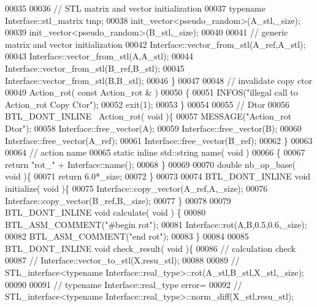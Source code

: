 \begin{DoxyCode}
00035 
00036     \textcolor{comment}{// STL matrix and vector initialization}
00037     \textcolor{keyword}{typename} Interface::stl\_matrix tmp;
00038     init\_vector<pseudo\_random>(A\_stl,\_size);
00039     init\_vector<pseudo\_random>(B\_stl,\_size);
00040 
00041     \textcolor{comment}{// generic matrix and vector initialization}
00042     Interface::vector\_from\_stl(A\_ref,A\_stl);
00043     Interface::vector\_from\_stl(A,A\_stl);
00044     Interface::vector\_from\_stl(B\_ref,B\_stl);
00045     Interface::vector\_from\_stl(B,B\_stl);
00046   \}
00047 
00048   \textcolor{comment}{// invalidate copy ctor}
00049   Action\_rot( \textcolor{keyword}{const}  Action\_rot & )
00050   \{
00051     INFOS(\textcolor{stringliteral}{"illegal call to Action\_rot Copy Ctor"});
00052     exit(1);
00053   \}
00054 
00055   \textcolor{comment}{// Dtor}
00056   BTL\_DONT\_INLINE ~Action\_rot( \textcolor{keywordtype}{void} )\{
00057     MESSAGE(\textcolor{stringliteral}{"Action\_rot Dtor"});
00058     Interface::free\_vector(A);
00059     Interface::free\_vector(B);
00060     Interface::free\_vector(A\_ref);
00061     Interface::free\_vector(B\_ref);
00062   \}
00063 
00064   \textcolor{comment}{// action name}
00065   \textcolor{keyword}{static} \textcolor{keyword}{inline} std::string name( \textcolor{keywordtype}{void} )
00066   \{
00067     \textcolor{keywordflow}{return} \textcolor{stringliteral}{"rot\_"} + Interface::name();
00068   \}
00069 
00070   \textcolor{keywordtype}{double} nb\_op\_base( \textcolor{keywordtype}{void} )\{
00071     \textcolor{keywordflow}{return} 6.0*\_size;
00072   \}
00073 
00074   BTL\_DONT\_INLINE  \textcolor{keywordtype}{void} initialize( \textcolor{keywordtype}{void} )\{
00075     Interface::copy\_vector(A\_ref,A,\_size);
00076     Interface::copy\_vector(B\_ref,B,\_size);
00077   \}
00078 
00079   BTL\_DONT\_INLINE \textcolor{keywordtype}{void} calculate( \textcolor{keywordtype}{void} ) \{
00080     BTL\_ASM\_COMMENT(\textcolor{stringliteral}{"#begin rot"});
00081     Interface::rot(A,B,0.5,0.6,\_size);
00082     BTL\_ASM\_COMMENT(\textcolor{stringliteral}{"end rot"});
00083   \}
00084 
00085   BTL\_DONT\_INLINE \textcolor{keywordtype}{void} check\_result( \textcolor{keywordtype}{void} )\{
00086     \textcolor{comment}{// calculation check}
00087 \textcolor{comment}{//     Interface::vector\_to\_stl(X,resu\_stl);}
00088 
00089 \textcolor{comment}{//     STL\_interface<typename Interface::real\_type>::rot(A\_stl,B\_stl,X\_stl,\_size);}
00090 
00091 \textcolor{comment}{//     typename Interface::real\_type error=}
00092 \textcolor{comment}{//       STL\_interface<typename Interface::real\_type>::norm\_diff(X\_stl,resu\_stl);}

\end{DoxyCode}
